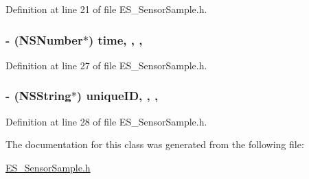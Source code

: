 Definition at line 21 of file E\+S\+\_\+\+Sensor\+Sample.\+h.

\hypertarget{interface_e_s___sensor_sample_a391e903a1a14fbb94489d9bbabeb54c1}{
\subsubsection[{time}]{\setlength{\rightskip}{0pt plus 5cm}-\/ (N\+S\+Number$\ast$) time\hspace{0.3cm}{\ttfamily [read]}, {\ttfamily [write]}, {\ttfamily [nonatomic]}, {\ttfamily [retain]}}}\label{interface_e_s___sensor_sample_a391e903a1a14fbb94489d9bbabeb54c1}


Definition at line 27 of file E\+S\+\_\+\+Sensor\+Sample.\+h.

\hypertarget{interface_e_s___sensor_sample_aee98559de7d5f09aa17493cdaa459cc4}{
\subsubsection[{unique\+I\+D}]{\setlength{\rightskip}{0pt plus 5cm}-\/ (N\+S\+String$\ast$) unique\+I\+D\hspace{0.3cm}{\ttfamily [read]}, {\ttfamily [write]}, {\ttfamily [nonatomic]}, {\ttfamily [retain]}}}\label{interface_e_s___sensor_sample_aee98559de7d5f09aa17493cdaa459cc4}


Definition at line 28 of file E\+S\+\_\+\+Sensor\+Sample.\+h.



The documentation for this class was generated from the following file\+:\begin{DoxyCompactItemize}
\item 
\hyperlink{_e_s___sensor_sample_8h}{E\+S\+\_\+\+Sensor\+Sample.\+h}\end{DoxyCompactItemize}
